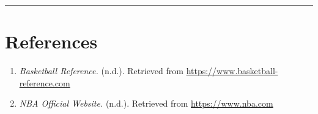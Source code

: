 \documentclass[
]{article}
\begin{document}
\begin{center}\rule{0.5\linewidth}{0.5pt}\end{center}

\hypertarget{references}{%
\section{References}\label{references}}

\begin{enumerate}
\def\labelenumi{\arabic{enumi}.}
\item
  \emph{Basketball Reference.} (n.d.). Retrieved from
  \url{https://www.basketball-reference.com}
\item
  \emph{NBA Official Website.} (n.d.). Retrieved from
  \url{https://www.nba.com}
\end{enumerate}
\end{document}
